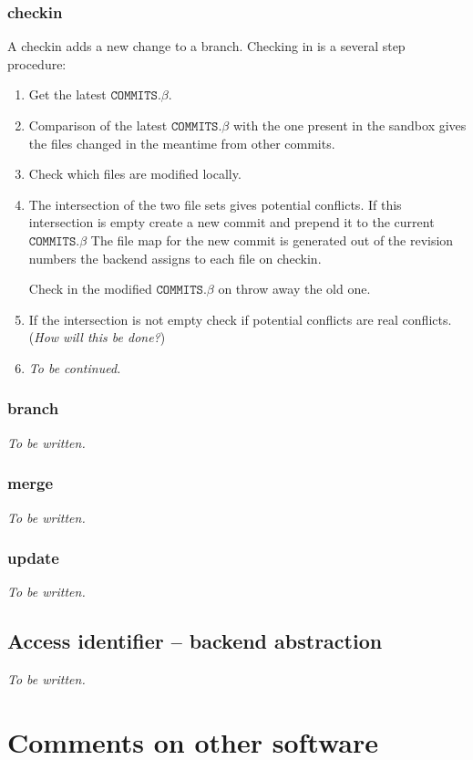 \documentclass[fleqn, 10pt, a4paper]{article}
\begin{document}
\subsubsection{checkin}

A checkin adds a new change to a branch. Checking in is a
several step procedure:

\begin{enumerate}
\item Get the latest $\mathtt{COMMITS.}\beta$.
\item Comparison of the latest $\mathtt{COMMITS.}\beta$ with 
the one present in the sandbox gives the files changed
in the meantime from other commits.
\item Check which files are modified locally.
\item The intersection of the two file sets gives potential
conflicts. If this intersection is empty create a new commit
and prepend it to the current $\mathtt{COMMITS.}\beta$
The file map for the new commit is generated out of
the revision numbers the backend assigns to each file on
checkin.

Check in the modified $\mathtt{COMMITS.}\beta$ on throw
away the old one.
\item If the intersection is not empty check if potential
conflicts are real conflicts. (\emph{How will this be done?})
\item \emph{To be continued.}
\end{enumerate}


\subsubsection{branch}
\emph{To be written.}

\subsubsection{merge}
\emph{To be written.}

\subsubsection{update}
\emph{To be written.}

\subsection{Access identifier -- backend abstraction}
\emph{To be written.}


\section{Comments on other software}
\end{document}
